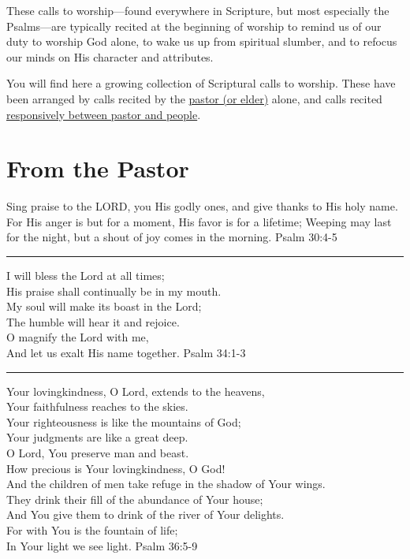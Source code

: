 \documentclass[]{book}
\begin{document}
These calls to worship---found everywhere in Scripture, but most
especially the Psalms---are typically recited at the beginning of
worship to remind us of our duty to worship God alone, to wake us up
from spiritual slumber, and to refocus our minds on His character and
attributes.

You will find here a growing collection of Scriptural calls to worship.
These have been arranged by calls recited by the
\protect\hyperlink{from-the-fastor}{pastor (or elder)} alone, and calls
recited \protect\hyperlink{responsive-calls}{responsively between pastor
and people}.

\section*{From the Pastor}\label{from-the-pastor}

Sing praise to the LORD, you His godly ones, and give thanks to His holy
name. For His anger is but for a moment, His favor is for a lifetime;
Weeping may last for the night, but a shout of joy comes in the morning.
\textbar{} Psalm 30:4-5

\begin{center}\rule{0.5\linewidth}{\linethickness}\end{center}

I will bless the Lord at all times;\\
His praise shall continually be in my mouth.\\
My soul will make its boast in the Lord;\\
The humble will hear it and rejoice.\\
O magnify the Lord with me,\\
And let us exalt His name together. \textbar{} Psalm 34:1-3

\begin{center}\rule{0.5\linewidth}{\linethickness}\end{center}

Your lovingkindness, O Lord, extends to the heavens,\\
Your faithfulness reaches to the skies.\\
Your righteousness is like the mountains of God;\\
Your judgments are like a great deep.\\
O Lord, You preserve man and beast.\\
How precious is Your lovingkindness, O God!\\
And the children of men take refuge in the shadow of Your wings.\\
They drink their fill of the abundance of Your house;\\
And You give them to drink of the river of Your delights.\\
For with You is the fountain of life;\\
In Your light we see light. \textbar{} Psalm 36:5-9
\end{document}
